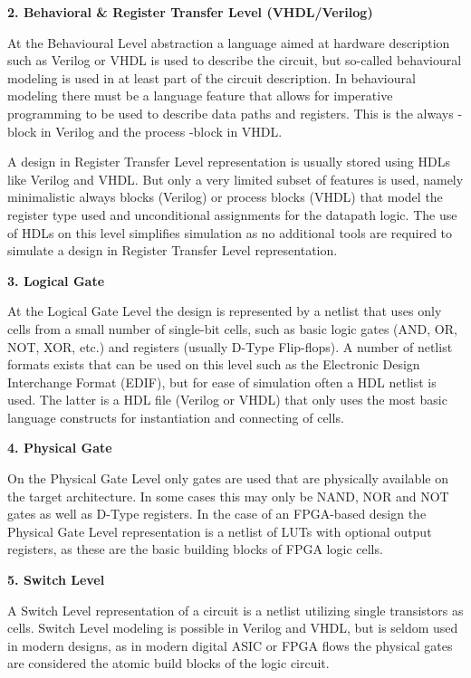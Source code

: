 \documentclass[]{article}
\begin{document}
\textbf{2. Behavioral \& Register Transfer Level (VHDL/Verilog)}

At the Behavioural Level abstraction a language aimed at hardware
description such as Verilog or VHDL is used to describe the circuit, but
so-called behavioural modeling is used in at least part of the circuit
description. In behavioural modeling there must be a language feature
that allows for imperative programming to be used to describe data paths
and registers. This is the always -block in Verilog and the process
-block in VHDL.

A design in Register Transfer Level representation is usually stored
using HDLs like Verilog and VHDL. But only a very limited subset of
features is used, namely minimalistic always blocks (Verilog) or process
blocks (VHDL) that model the register type used and unconditional
assignments for the datapath logic. The use of HDLs on this level
simplifies simulation as no additional tools are required to simulate a
design in Register Transfer Level representation.

\textbf{3. Logical Gate}

At the Logical Gate Level the design is represented by a netlist that
uses only cells from a small number of single-bit cells, such as basic
logic gates (AND, OR, NOT, XOR, etc.) and registers (usually D-Type
Flip-flops). A number of netlist formats exists that can be used on this
level such as the Electronic Design Interchange Format (EDIF), but for
ease of simulation often a HDL netlist is used. The latter is a HDL file
(Verilog or VHDL) that only uses the most basic language constructs for
instantiation and connecting of cells.

\textbf{4. Physical Gate}

On the Physical Gate Level only gates are used that are physically
available on the target architecture. In some cases this may only be
NAND, NOR and NOT gates as well as D-Type registers. In the case of an
FPGA-based design the Physical Gate Level representation is a netlist of
LUTs with optional output registers, as these are the basic building
blocks of FPGA logic cells.

\textbf{5. Switch Level}

A Switch Level representation of a circuit is a netlist utilizing single
transistors as cells. Switch Level modeling is possible in Verilog and
VHDL, but is seldom used in modern designs, as in modern digital ASIC or
FPGA flows the physical gates are considered the atomic build blocks of
the logic circuit.
\end{document}
